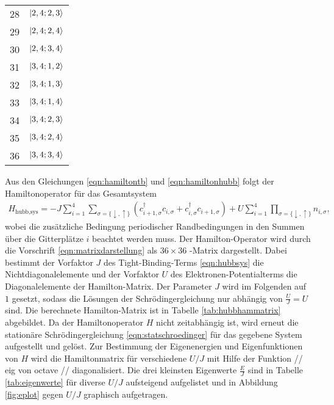 \begin{table}
\begin{minipage}[t]{0.35\linewidth}
\begin{tabular}{S[table-format=2.0] S}
      28 & $\ket{2,4;2,3}$ \\
      29 & $\ket{2,4;2,4}$ \\
      30 & $\ket{2,4;3,4}$ \\
      31 & $\ket{3,4;1,2}$ \\
      32 & $\ket{3,4;1,3}$ \\
      33 & $\ket{3,4;1,4}$ \\
      34 & $\ket{3,4;2,3}$ \\
      35 & $\ket{3,4;2,4}$ \\
      36 & $\ket{3,4;3,4}$ \\
    \end{tabular}
  \end{minipage}
  \label{tab:hubbzustandsvorschrift}
\end{table}

Aus den Gleichungen \eqref{eqn:hamiltontb} und \eqref{eqn:hamiltonhubb} folgt der Hamiltonoperator für das Gesamtsystem
\begin{align}
  H_\text{hubb,sys} = -J \sum_{i=1}^4 \sum_{\sigma = \{ \downarrow,\uparrow \}} (c_{i+1,\sigma}^{\dag}c_{i,\sigma} + c_{i,\sigma}^{\dag}c_{i+1,\sigma}) + U\sum_{i=1}^4 \prod_{\sigma = \{ \downarrow,\uparrow \}} n_{i,\sigma},
  \label{eqn:hubbsys}
\end{align}
wobei die zusätzliche Bedingung periodischer Randbedingungen in den Summen über die Gitterplätze $i$ beachtet werden muss.
Der Hamilton-Operator wird durch die Vorschrift \eqref{eqn:matrixdarstellung} als $36 \times 36$ -Matrix dargestellt.
Dabei bestimmt der Vorfaktor $J$ des Tight-Binding-Terms \eqref{eqn:hubbsys} die Nichtdiagonalelemente und der
Vorfaktor $U$ des Elektronen-Potentialterms die Diagonalelemente der Hamilton-Matrix. Der Parameter $J$ wird im Folgenden auf $1$ gesetzt, sodass die Lösungen der Schrödingergleichung nur abhängig von $\frac{U}{J} = U$ sind.
Die berechnete Hamilton-Matrix ist in Tabelle \ref{tab:hubbhammatrix} abgebildet. Da der Hamiltonoperator $H$ nicht zeitabhängig ist, wird erneut die stationäre Schrödingergleichung \eqref{eqn:statschroedinger}
für das gegebene System aufgestellt und gelöst.
Zur Bestimmung der Eigenenergien und Eigenfunktionen von $H$ wird die Hamiltonmatrix für verschiedene $U/J$ mit Hilfe der Funktion // eig von octave // diagonalisiert. Die drei kleinsten Eigenwerte $\frac{E}{J}$ sind
in Tabelle \ref{tab:eigenwerte} für diverse $U/J$ aufsteigend aufgelistet und in Abbildung \ref{fig:eplot} gegen $U/J$ graphisch aufgetragen.

